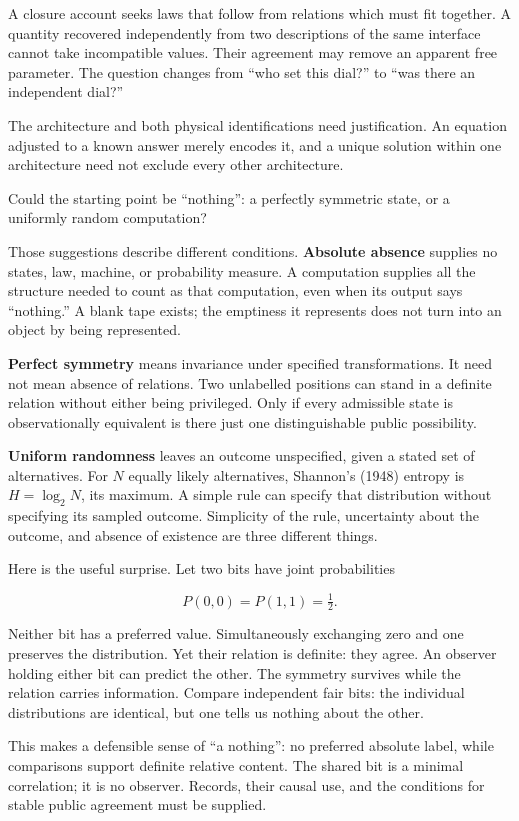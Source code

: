 \documentclass[
  11pt,
]{article}
\begin{document}
A closure account seeks laws that follow from relations which must fit
together. A quantity recovered independently from two descriptions of
the same interface cannot take incompatible values. Their agreement may
remove an apparent free parameter. The question changes from ``who set
this dial?'' to ``was there an independent dial?''

The architecture and both physical identifications need
justification. An equation adjusted to a known answer merely encodes it,
and a unique solution within one architecture need not exclude every
other architecture.

Could the starting point be ``nothing'': a perfectly symmetric state, or
a uniformly random computation?

Those suggestions describe different conditions. \textbf{Absolute
absence} supplies no states, law, machine, or probability measure. A
computation supplies all the structure needed to count as that
computation, even when its output says ``nothing.'' A blank tape exists;
the emptiness it represents does not turn into an object by being
represented.

\textbf{Perfect symmetry} means invariance under specified
transformations. It need not mean absence of relations. Two unlabelled
positions can stand in a definite relation without either being
privileged. Only if every admissible state is observationally equivalent
is there just one distinguishable public possibility.

\textbf{Uniform randomness} leaves an outcome unspecified, given a
stated set of alternatives. For \(N\) equally likely alternatives,
Shannon's (1948) entropy is \(H=\log_2N\), its maximum. A simple rule
can specify that distribution without specifying its sampled outcome.
Simplicity of the rule, uncertainty about the outcome, and absence of
existence are three different things.

Here is the useful surprise. Let two bits have joint probabilities

\[
 P(0,0)=P(1,1)=\tfrac12.
\]

Neither bit has a preferred value. Simultaneously exchanging zero and
one preserves the distribution. Yet their relation is definite: they
agree. An observer holding either bit can predict the other. The
symmetry survives while the relation carries information. Compare
independent fair bits: the individual distributions are identical, but
one tells us nothing about the other.

This makes a defensible sense of ``a nothing'': no preferred absolute
label, while comparisons support definite relative content. The shared
bit is a minimal correlation; it is no observer. Records, their causal
use, and the conditions for stable public agreement must be
supplied.
\end{document}
